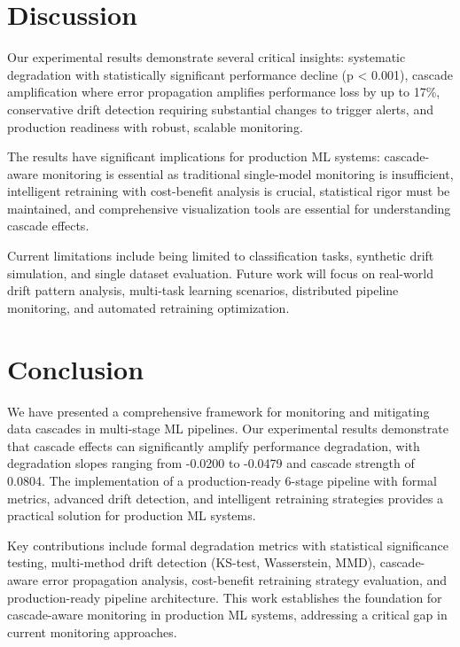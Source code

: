 \documentclass{article}
\begin{document}
\section{Discussion}

Our experimental results demonstrate several critical insights: systematic degradation with statistically significant performance decline (p < 0.001), cascade amplification where error propagation amplifies performance loss by up to 17\%, conservative drift detection requiring substantial changes to trigger alerts, and production readiness with robust, scalable monitoring.

The results have significant implications for production ML systems: cascade-aware monitoring is essential as traditional single-model monitoring is insufficient, intelligent retraining with cost-benefit analysis is crucial, statistical rigor must be maintained, and comprehensive visualization tools are essential for understanding cascade effects.

Current limitations include being limited to classification tasks, synthetic drift simulation, and single dataset evaluation. Future work will focus on real-world drift pattern analysis, multi-task learning scenarios, distributed pipeline monitoring, and automated retraining optimization.

\section{Conclusion}

We have presented a comprehensive framework for monitoring and mitigating data cascades in multi-stage ML pipelines. Our experimental results demonstrate that cascade effects can significantly amplify performance degradation, with degradation slopes ranging from -0.0200 to -0.0479 and cascade strength of 0.0804. The implementation of a production-ready 6-stage pipeline with formal metrics, advanced drift detection, and intelligent retraining strategies provides a practical solution for production ML systems.

Key contributions include formal degradation metrics with statistical significance testing, multi-method drift detection (KS-test, Wasserstein, MMD), cascade-aware error propagation analysis, cost-benefit retraining strategy evaluation, and production-ready pipeline architecture. This work establishes the foundation for cascade-aware monitoring in production ML systems, addressing a critical gap in current monitoring approaches.
\end{document}
